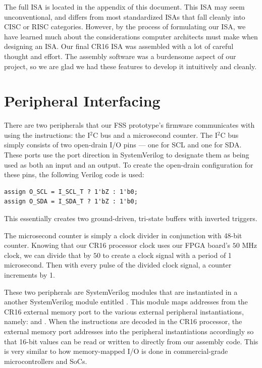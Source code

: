 \documentclass[conference]{IEEEtran}
\begin{document}
 The full ISA is located in the appendix of this document. This ISA may seem unconventional, and differs from most standardized ISAs that fall cleanly into CISC or RISC categories. However, by the process of formulating our ISA, we have learned much about the considerations computer architects must make when designing an ISA. Our final CR16 ISA was assembled with a lot of careful thought and effort. The assembly software was a burdensome aspect of our project, so we are glad we had these features to develop it intuitively and cleanly.

\section{Peripheral Interfacing}
There are two peripherals that our FSS prototype's firmware communicates with using the  instructions: the I$^2$C bus and a microsecond counter. The I$^2$C bus simply consists of two open-drain I/O pins --- one for SCL and one for SDA. These ports use the  port direction in SystemVerilog to designate them as being used as both an input and an output. To create the open-drain configuration for these pins, the following Verilog code is used:
\begin{verbatim}
assign O_SCL = I_SCL_T ? 1'bZ : 1'b0;
assign O_SDA = I_SDA_T ? 1'bZ : 1'b0;
\end{verbatim}
This essentially creates two ground-driven, tri-state buffers with inverted triggers.

The microsecond counter is simply a clock divider in conjunction with 48-bit counter. Knowing that our CR16 processor clock uses our FPGA board's $50$ MHz clock, we can divide that by $50$ to create a clock signal with a period of 1 microsecond. Then with every pulse of the divided clock signal, a counter increments by 1.

These two peripherals are SystemVerilog modules that are instantiated in a another SystemVerilog module entitled . This module maps addresses from the CR16 external memory port to the various external peripheral instantiations, namely:  and . When the  instructions are decoded in the CR16 processor, the external memory port addresses into the peripheral instantiations accordingly so that 16-bit values can be read or written to directly from our assembly code. This is very similar to how memory-mapped I/O is done in commercial-grade microcontrollers and SoCs.
\end{document}
